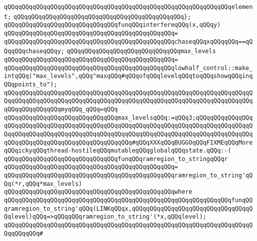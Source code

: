\verb|qQQqqQQqqQQqqQQqqQQqqQQqqQQqqQQqqQQqqQQqqQQqqQQqqQQqqQQqqQQqqQQqelement;|\newline
\verb|qQQqqQQqqQQqqQQqqQQqqQQqqQQqqQQqqQQqqQQqqQQqqQQq};|\newline
\newline
\verb|qQQqqQQqqQQqqQQqqQQqqQQqqQQqqQQqfunqQQqinterfereqQQq(x,qQQqy)|\newline
\verb|qQQqqQQqqQQqqQQqqQQqqQQqqQQqqQQqqQQqqQQqqQQqqQQq=|\newline
\verb|qQQqqQQqqQQqqQQqqQQqqQQqqQQqqQQqqQQqqQQqqQQqqQQqchaseqQQqxqQQqqQQq==qQQqqQQqchaseqQQqy;|\newline
\newline
\verb|qQQqqQQqqQQqqQQqqQQqqQQqqQQqqQQqmax_levels|\newline
\verb|qQQqqQQqqQQqqQQqqQQqqQQqqQQqqQQqqQQqqQQqqQQqqQQq=|\newline
\verb|qQQqqQQqqQQqqQQqqQQqqQQqqQQqqQQqqQQqqQQqqQQqqQQqlowhalf_control::make_intqQQq("max_levels",qQQq"maxqQQq#qQQqofqQQqlevelqQQqtoqQQqshowqQQqinqQQqpoints_to");|\newline
\newline
\verb|qQQqqQQqqQQqqQQqqQQqqQQqqQQqqQQqqQQqqQQqqQQqqQQqqQQqqQQqqQQqqQQqqQQqqQQqqQQqqQQqqQQqqQQqqQQqqQQqqQQqqQQqqQQqqQQqqQQqqQQqqQQqqQQqqQQqqQQqqQQqqQQqqQQqqQQqqQQqmyqQQq_qQQq=qQQq|\newline
\verb|qQQqqQQqqQQqqQQqqQQqqQQqqQQqqQQqmax_levelsqQQq:=qQQq3;qQQqqQQqqQQqqQQqqQQqqQQqqQQqqQQqqQQqqQQqqQQqqQQqqQQqqQQqqQQqqQQqqQQqqQQqqQQqqQQqqQQqqQQqqQQqqQQqqQQqqQQqqQQqqQQqqQQqqQQqqQQqqQQqqQQqqQQqqQQqqQQqqQQqqQQqqQQqqQQqqQQqqQQqqQQqqQQqqQQqqQQqqQQqqQQq#qQQqXXXqQQqBUGGOqQQqFIXMEqQQqMoreqQQqickyqQQqthread-hostileqQQqmutableqQQqglobalqQQqstate.qQQq:-(|\newline
\newline
\verb|qQQqqQQqqQQqqQQqqQQqqQQqqQQqqQQqfunqQQqramregion_to_stringqQQqr|\newline
\verb|qQQqqQQqqQQqqQQqqQQqqQQqqQQqqQQqqQQqqQQqqQQqqQQq=|\newline
\verb|qQQqqQQqqQQqqQQqqQQqqQQqqQQqqQQqqQQqqQQqqQQqqQQqramregion_to_string'qQQq(*r,qQQq*max_levels)|\newline
\verb|qQQqqQQqqQQqqQQqqQQqqQQqqQQqqQQqqQQqqQQqqQQqqQQqwhere|\newline
\verb|qQQqqQQqqQQqqQQqqQQqqQQqqQQqqQQqqQQqqQQqqQQqqQQqqQQqqQQqqQQqqQQqfunqQQqramregion_to_string'qQQq(LINKqQQqx,qQQqqQQqqQQqqQQqqQQqqQQqqQQqqQQqqQQqlevel)qQQq=>qQQqqQQqramregion_to_string'(*x,qQQqlevel);|\newline
\verb|qQQqqQQqqQQqqQQqqQQqqQQqqQQqqQQqqQQqqQQqqQQqqQQqqQQqqQQqqQQqqQQqqQQqqQQqqQQqqQQq#|\newline
